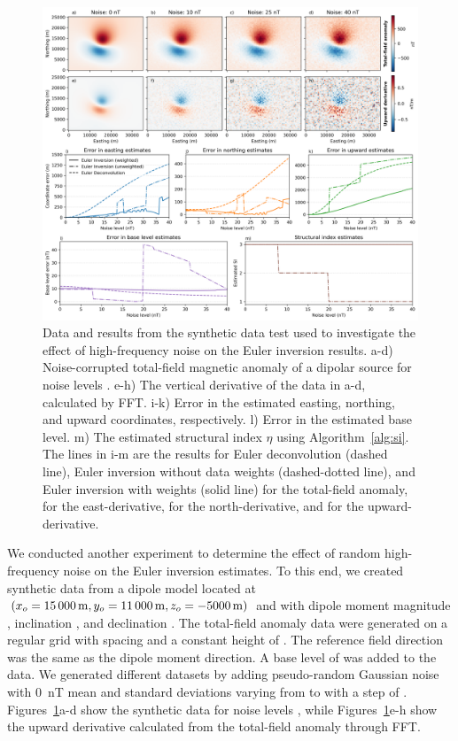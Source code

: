 \begin{figure}[tb!]
\centering
\includegraphics[width=1\linewidth]{figures/synthetic-noise-levels.png}
\caption{
    Data and results from the synthetic data test used to investigate the effect of high-frequency noise on the Euler inversion results.
    a-d) Noise-corrupted total-field magnetic anomaly of a dipolar source for noise levels \SynNoisePlotted.
    e-h) The vertical derivative of the data in a-d, calculated by FFT. 
    i-k) Error in the estimated easting, northing, and upward coordinates, respectively.
    l) Error in the estimated base level.
    m) The estimated structural index $\eta$ using Algorithm~\ref{alg:si}. 
    The lines in i-m are the results for Euler deconvolution (dashed line), Euler inversion without data weights (dashed-dotted line), and Euler inversion with weights (solid line) \SynNoiseWeightsF{} for the total-field anomaly, \SynNoiseWeightsE{} for the east-derivative, \SynNoiseWeightsN{} for the north-derivative, and \SynNoiseWeightsU{} for the upward-derivative.
}
\label{fig:noise}
\end{figure}

We conducted another experiment to determine the effect of random high-frequency noise on the Euler inversion estimates. 
To this end, we created synthetic data from a dipole model located at $(x_o=\SynNoiseTrueEast, y_o=\SynNoiseTrueNorth, z_o=\SynNoiseTrueUp)$ and with dipole moment magnitude \SynNoiseInt{}, inclination \SynNoiseInc, and declination \SynNoiseDec.
The total-field anomaly data were generated on a regular grid with spacing \SynNoiseSpacing{} and a constant height of \SynNoiseHeight.
The reference field direction was the same as the dipole moment direction.
A base level of \SynNoiseTrueBase{} was added to the data.
We generated different datasets by adding pseudo-random Gaussian noise with \qty{0}{\nano\tesla} mean and standard deviations varying from \SynNoiseMin{} to \SynNoiseMax{} with a step of \SynNoiseStep{}.
Figures~\ref{fig:noise}a-d show the synthetic data for noise levels \SynNoisePlotted, while Figures~\ref{fig:noise}e-h show the upward derivative calculated from the total-field anomaly through FFT. 

